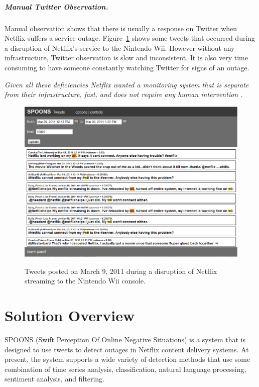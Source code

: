 \documentclass[12pt]{ucthesis}
\newcommand{\captionfonts}{\small\bf\ssp}
\begin{document}
\paragraph{Manual Twitter Observation.}
Manual observation shows that there is usually a response on Twitter when Netflix suffers a service
outage. Figure~\ref{fig:tweetEx} shows some tweets that occurred during a disruption of Netflix's service to
the Nintendo Wii. However without any infrastructure, Twitter observation is slow and inconsistent.
It is also very time consuming to have someone constantly watching Twitter for signs of an outage.

\emph{Given all these deficiencies Netflix wanted a monitoring system that is separate from their infrastructure,
fast, and does not require any human intervention \cite{kevin}.}

\begin{figure}
   \begin{center}
      \includegraphics[width=140mm]{images/tweetexample.eps}
      \captionfonts
      \caption[Outage Tweets Example]{Tweets posted on March 9, 2011 during a disruption of Netflix
                                       streaming to the Nintendo Wii console.}
      \label{fig:tweetEx}
   \end{center}
\end{figure}


\chapter{Solution Overview}
\label{overview}

SPOONS (Swift Perception Of Online Negative Situations) is a system that is
designed to use tweets to detect outages in Netflix content delivery systems.
At present, the system supports a wide variety of detection methods that use some combination of time
series analysis, classification, natural language processing, sentiment
analysis, and filtering.
\end{document}
